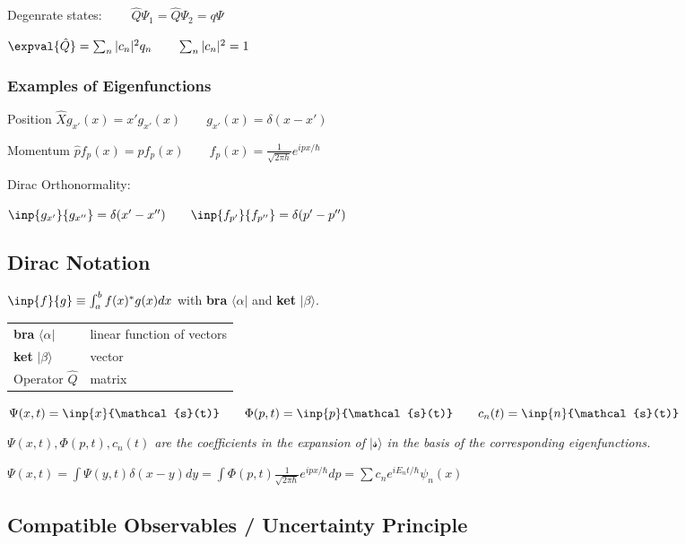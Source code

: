 \documentclass[10pt,a4paper]{scrartcl}
\begin{document}
\begin{multicols*}{3}
	Degenrate states: $\qquad\hat{Q}\Psi_1=\hat{Q}\Psi_2=q\Psi$
	
	
	$\expval{\hat{Q}}=\sum_n{|c_n|^2q_n}\qquad\sum_n{|c_n|^2}=1$
	
	\subsubsection{Examples of Eigenfunctions}
	
	Position	$\hat{X}g_{x'}(x)=x'g_{x'}(x)\qquad g_{x'}(x)=\delta(x-x')$
	
	Momentum	$\hat{p}f_p(x)=pf_p(x)\qquad f_p(x)=\frac{1}{\sqrt{2\pi h}}e^{ipx/\hbar}$
	
	Dirac Orthonormality: 
	
	$\inp{g_{x'}}{g_{x''}}=\delta(x'-x'')\qquad \inp{f_{p'}}{f_{p''}}=\delta(p'-p'')$
	
	\subsection{Dirac Notation}
	
	$\inp{f}{g}\equiv \int_a^b{f(x)^*g(x)dx}$ with \textbf{bra} $\langle \alpha|$ and \textbf{ket} $|\beta\rangle$.
	
	\begin{tabular}{l@{   -   }l}
	\textbf{bra} $\langle \alpha|$ & linear function of vectors\\
	\textbf{ket} $|\beta\rangle$ & vector\\
	Operator $\hat{Q}$ & matrix\\
	\end{tabular}	
	
	$\Psi(x,t)=\inp{x}{\mathcal{s}(t)}\qquad \Phi(p,t)=\inp{p}{\mathcal{s}(t)}\qquad c_n(t)=\inp{n}{\mathcal{s}(t)}$
	
	\emph{$\Psi(x,t),\Phi(p,t),c_n(t)$ are the coefficients in the expansion of $|\mathcal{s}\rangle$ in the basis of the corresponding eigenfunctions.}
	
	\scriptsize
	$\Psi(x,t)=\int{\Psi(y,t)\delta(x-y)dy=\int{\Phi(p,t)\frac{1}{\sqrt{2\pi\hbar}}e^{ipx/\hbar}dp}=\sum{c_ne^{iE_nt/\hbar}\psi_n(x)}}$
	\normalsize
	
	\subsection{Compatible Observables / Uncertainty Principle}
	

\end{multicols*}
\end{document}
